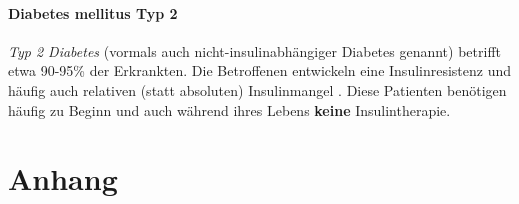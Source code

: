 \documentclass{article}
\begin{document}
\subsubsection{Diabetes mellitus Typ 2}

\textit{Typ 2 Diabetes} (vormals auch nicht-insulinabhängiger Diabetes genannt) betrifft etwa 90-95\% der Erkrankten. Die Betroffenen entwickeln eine Insulinresistenz und häufig auch relativen (statt absoluten) Insulinmangel \cite{ada}. Diese Patienten benötigen häufig zu Beginn und auch während ihres Lebens \textbf{keine} Insulintherapie. 


\newpage

\appendix
\chapter{Anhang}

\newpage

\printbibliography
\end{document}
